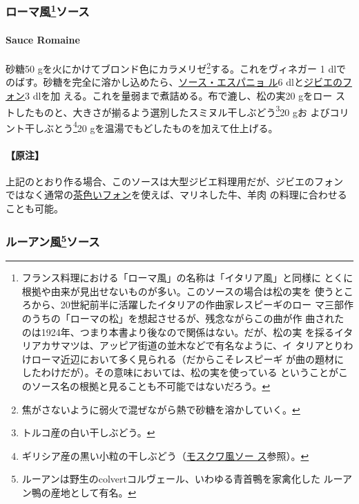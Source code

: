 \hypertarget{ux30edux30fcux30deux98a880ux30bdux30fcux30b9}{%
\subsubsection[ローマ風ソース]{\texorpdfstring{ローマ風\footnote{フランス料理における「ローマ風」の名称は「イタリア風」と同様に
  とくに根拠や由来が見出せないものが多い。このソースの場合は松の実を
  使うところから、20世紀前半に活躍したイタリアの作曲家レスピーギのロー
  マ三部作のうちの「ローマの松」を想起させるが、残念ながらこの曲が作
  曲されたのは1924年、つまり本書より後なので関係はない。だが、松の実
  を採るイタリアカサマツは、アッピア街道の並木などで有名なように、イ
  タリアとりわけローマ近辺において多く見られる（だからこそレスピーギ
  が曲の題材にしたわけだが）。その意味においては、松の実を使っている
  ということがこのソース名の根拠と見ることも不可能ではないだろう。}ソース}{ローマ風ソース}}\label{ux30edux30fcux30deux98a880ux30bdux30fcux30b9}}

\hypertarget{sauce-romaine}{%
\paragraph{Sauce Romaine}\label{sauce-romaine}}

砂糖50 gを火にかけてブロンド色にカラメリゼ\footnote{焦がさないように弱火で混ぜながら熱で砂糖を溶かしていく。}する。これをヴィネガー
1\undemi{}
dlでのばす。砂糖を完全に溶かし込めたら、\protect\hyperlink{sauce-espagnole}{ソース・エスパニョ
ル}6 dlと\protect\hyperlink{fonds-de-gibier}{ジビエのフォン}3 dlを加
える。これを\troisquarts{}量弱まで煮詰める。布で漉し、松の実20 gをロー
ストしたものと、大きさが揃るよう選別したスミヌル干しぶどう\footnote{トルコ産の白い干しぶどう。}20
gお よびコリント干しぶとう\footnote{ギリシア産の黒い小粒の干しぶどう（\protect\hyperlink{sauce-moscovite}{モスクワ風ソー
  ス}参照）。}20 gを温湯でもどしたものを加えて仕上げる。

\hypertarget{ux539fux6ce8-8}{%
\paragraph{【原注】}\label{ux539fux6ce8-8}}

上記のとおり作る場合、このソースは大型ジビエ料理用だが、ジビエのフォン
ではなく通常の\protect\hyperlink{fonds-brun}{茶色いフォン}を使えば、マリネした牛、羊肉
の料理に合わせることも可能。

\maeaki

\hypertarget{ux30ebux30fcux30a2ux30f3ux98a884ux30bdux30fcux30b9}{%
\subsubsection[ルーアン風ソース]{\texorpdfstring{ルーアン風\footnote{ルーアンは野生のcolvertコルヴェール、いわゆる青首鴨を家禽化した
  ルーアン鴨の産地として有名。}ソース}{ルーアン風ソース}}\label{ux30ebux30fcux30a2ux30f3ux98a884ux30bdux30fcux30b9}}

